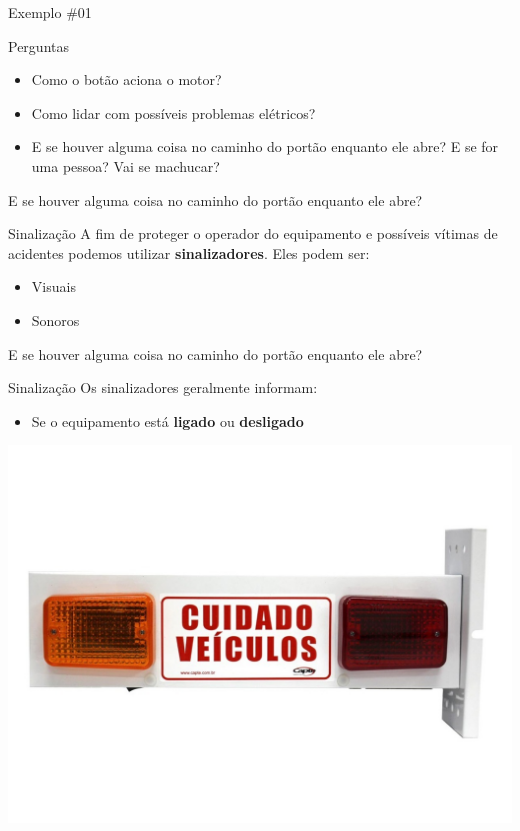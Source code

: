 \begin{frame}{Exemplo \#01}
\begin{block}{Perguntas}
	\begin{itemize}
		\item Como o botão aciona o motor? \checkmark
		\item Como lidar com possíveis problemas elétricos? \checkmark
		\item E se houver alguma coisa no caminho do portão enquanto ele abre? E se for uma pessoa? Vai se machucar?
	\end{itemize}
\end{block}
\end{frame}


\begin{frame}{E se houver alguma coisa no caminho do portão enquanto ele abre?}
\begin{block}{Sinalização}
	A fim de proteger o operador do equipamento e possíveis vítimas de acidentes podemos utilizar \textbf{sinalizadores}. Eles podem ser:
	\begin{itemize}
		\item Visuais
		\item Sonoros
	\end{itemize}
\end{block}
\end{frame}

\begin{frame}{E se houver alguma coisa no caminho do portão enquanto ele abre?}
\begin{block}{Sinalização}
	Os sinalizadores geralmente informam:
	\begin{itemize}
		\item Se o equipamento está \textbf{ligado} ou \textbf{desligado}
	\end{itemize}
\end{block}
\centerline{\includegraphics[width=0.7\linewidth]{Figuras/Ch05/fig15.jpg}}
\end{frame}

